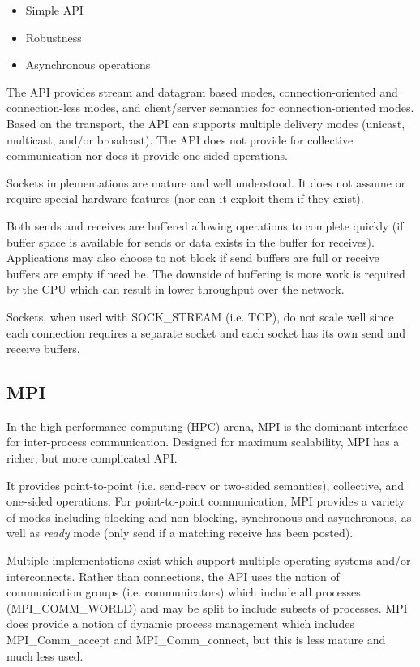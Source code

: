 \documentclass[conference]{IEEEtran}
\begin{document}
\begin{itemize}
\item Simple API
\item Robustness
\item Asynchronous operations
\end{itemize}

The API provides stream and datagram based modes, connection-oriented and connection-less
modes, and client/server semantics for connection-oriented modes. Based on the transport,
the API can supports multiple delivery modes (unicast, multicast, and/or broadcast). The
API does not provide for collective communication nor does it provide one-sided
operations.

Sockets implementations are mature and well understood. It does not assume or require
special hardware features (nor can it exploit them if they exist).

Both sends and receives are buffered allowing operations to complete quickly (if buffer
space is available for sends or data exists in the buffer for receives). Applications may
also choose to not block if send buffers are full or receive buffers are empty if need be.
The downside of buffering is more work is required by the CPU which can result in lower
throughput over the network.

Sockets, when used with SOCK\_STREAM (i.e. TCP), do not scale well since each connection
requires a separate socket and each socket has its own send and receive buffers.

\subsection{MPI} In the high performance computing (HPC) arena, MPI is the dominant
interface for inter-process communication. Designed for maximum scalability, MPI has a
richer, but more complicated API.

It provides point-to-point (i.e. send-recv or two-sided semantics), collective, and
one-sided operations. For point-to-point communication, MPI provides a variety of modes
including blocking and non-blocking, synchronous and asynchronous, as well as \emph{ready}
mode (only send if a matching receive has been posted).

Multiple implementations exist\cite{ompi, mpich2, mvapich, intel-mpi, platform-mpi}
which support multiple operating systems and/or interconnects.  Rather than connections,
the API uses the notion of communication groups (i.e.  communicators) which include all
processes (MPI\_COMM\_WORLD) and may be split to include subsets of processes. MPI does
provide a notion of dynamic process management which includes MPI\_Comm\_accept and
MPI\_Comm\_connect, but this is less mature and much less used.
\end{document}
